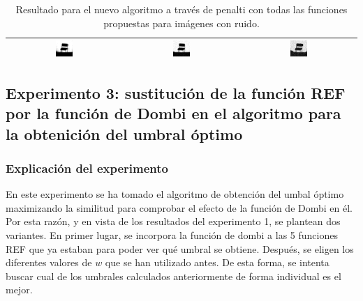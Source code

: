 \begin{table}
\centering
\begin{tabular}{ccc}\hline
\includegraphics[width=0.15\textwidth]{img/res/e2a/alg1agregate-chairga.jpg} &
\includegraphics[width=0.15\textwidth]{img/res/e2a/alg1agregate-chairsp005.jpg} &
\includegraphics[width=0.15\textwidth]{img/res/e2a/alg1agregate-chairsp020.jpg}\\\hline
\end{tabular}
\caption{Resultado para el nuevo algoritmo a través de penalti con todas las funciones propuestas para imágenes con ruido.\label{tab:resultexp2agregado}}
\end{table}



\subsection{Experimento 3: sustitución de la función REF por la función de Dombi en el algoritmo para la obtenición del umbral óptimo}

\subsubsection{Explicación del experimento}
En este experimento se ha tomado el algoritmo de obtención del umbal óptimo maximizando la similitud para comprobar el efecto de la función de Dombi en él. Por esta razón, y en vista de los resultados del experimento 1, se plantean dos variantes. En primer lugar, se incorpora la función de dombi a las 5 funciones REF que ya estaban para poder ver qué umbral se obtiene. Después, se eligen los diferentes valores de $w$ que se han utilizado antes. De esta forma, se intenta buscar cual de los umbrales calculados anteriormente de forma individual es el mejor.

